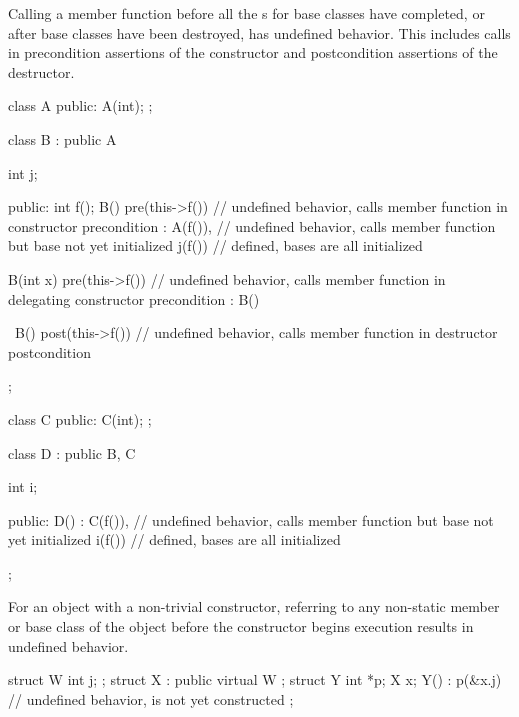 
\pnum
Calling a member function
before all the s
for base classes have completed,
or after base classes have been destroyed,
has undefined behavior.
This includes calls in
precondition assertions of the constructor
and postcondition assertions of the destructor.

\pnum
\begin{example}
\begin{codeblock}
class A {
public:
  A(int);
};

class B : public A {
  int j;

public:
  int f();
  B()
      pre(this->f())    // undefined behavior, calls member function in constructor precondition
      : A(f()),         // undefined behavior, calls member function but base  not yet initialized
        j(f()) {}       // defined, bases are all initialized

  B(int x)
      pre(this->f())    // undefined behavior, calls member function in delegating constructor precondition
      : B() {}

  ~B()
      post(this->f())   // undefined behavior, calls member function in destructor postcondition
      {}
};

class C {
public:
  C(int);
};

class D : public B, C {
  int i;

public:
  D()
      : C(f()),         // undefined behavior, calls member function but base  not yet initialized
        i(f()) {}       // defined, bases are all initialized
};
\end{codeblock}
\end{example}


\pnum
For an object with a non-trivial constructor,
referring to any non-static member or base class of the object
before the constructor begins execution results in undefined behavior.

\pnum
\begin{example}
\begin{codeblock}
struct W {
  int j;
};
struct X : public virtual W {};
struct Y {
  int *p;
  X x;
  Y() : p(&x.j) {       // undefined behavior,  is not yet constructed
  }
};
\end{codeblock}
\end{example}


